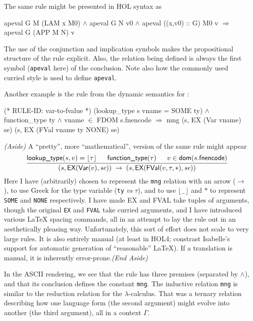 \documentclass[11pt]{article}
\begin{document}
The same rule might be presented in HOL syntax as
\begin{stdrule}
     apeval G M (LAM x M0) \(\land\)
     apeval G N v0 \(\land\)
     apeval ((x,v0) :: G) M0 v
   \(\Rightarrow\)
     apeval G (APP M N) v
\end{stdrule}
The use of the conjunction and implication symbols makes the
propositional structure of the rule explicit.  Also, the relation
being defined is always the first symbol (\texttt{apeval} here) of the
conclusion.  Note also how the commonly used curried style is used to
define \texttt{apeval}.

Another example is the rule  from the dynamic
semantics for \cpp{}:
\begin{stdrule}
(* RULE-ID: var-to-fvalue *)
     (lookup_type s vname = SOME ty) \(\land\)
     function_type ty \(\land\)
     vname \(\in\) FDOM s.fnencode
   \(\Rightarrow\)
     mng (s, EX (Var vname) se) (s, EX (FVal vname ty NONE) se)
\end{stdrule}
\textit{(Aside)} A ``pretty'', more ``mathematical'', version of the same rule might
appear
\[
\infer{(s,\textsf{EX}(\textsf{Var}(v),\mathit{se})) \;\rightarrow\;
       (s,\textsf{EX}(\textsf{FVal}(v,\tau,*),\mathit{se}))}{
       \textsf{lookup\_type}(s,v) = \lfloor\tau\rfloor \;&\;
       \textsf{function\_type}(\tau) \;&\;
       v \in \textsf{dom}(s.\textsf{fnencode})}
\]
Here I have (arbitrarily) chosen to represent the \texttt{mng}
relation with an arrow ($\rightarrow$), to use Greek for the type
variable (\texttt{ty} \textit{vs} $\tau$), and to use
$\lfloor\,\_\,\rfloor$ and $*$ to represent \texttt{SOME} and
\texttt{NONE} respectively.  I have made \textsf{EX} and \textsf{FVAL}
take tuples of arguments, though the original \texttt{EX} and
\texttt{FVAL} take curried arguments, and I have introduced various
\LaTeX{} spacing commands, all in an attempt to lay the rule out in an
aesthetically pleasing way.  Unfortunately, this sort of effort does
not scale to very large rules. It is also entirely manual (at least in
HOL4; constrast Isabelle's support for automatic generation of
``reasonable'' \LaTeX).  If a translation is manual, it is inherently
error-prone.\hfill{\textit{(End Aside)}}

In the ASCII rendering, we see that the rule has three premises
(separated by $\land$), and that its conclusion defines the constant
\texttt{mng}.  The inductive relation \texttt{mng} is similar to the
reduction relation for the $\lambda$-calculus. That was a ternary
relation describing how one language form (the second argument) might
evolve into another (the third argument), all in a context $\Gamma$.
\end{document}
